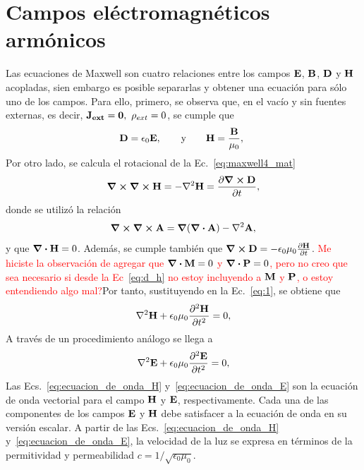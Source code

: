 \section{Campos eléctromagnéticos armónicos}
Las ecuaciones de Maxwell son cuatro relaciones entre los campos $\vb{E}$, $\vb{B}$, $\vb{D}$ y $\vb{H}$ acopladas, sien embargo es posible separarlas y obtener una ecuación para sólo uno de los campos. Para ello, primero, se observa que, en el vacío y sin fuentes externas, es decir, $\vb{J_{ext}}=\vb{0},\ \rho_{ext}=0$, se cumple que
\begin{eqnarray}
\vb{D}=\epsilon_{0}\vb{E},\qquad\text{y}\qquad\vb{H}=\frac{\vb{B}}{\mu_{0}},~\label{eq:d_h}
\end{eqnarray}
Por otro lado, se calcula el rotacional de la Ec.~\eqref{eq:maxwell4_mat}
\begin{equation}
\curl \curl \vb{H}= - \laplacian \vb{H}= \pdv{\curl\vb{D}}{t},\label{eq:1}
\end{equation}
donde se utilizó la relación~\cite{griffiths2013electrodynamics}
\begin{equation}
\curl\curl\vb{A}= \grad(\div \vb{A}) - \laplacian \vb{A},\label{eq:propiedad}
\end{equation}
y que $\div \vb{H}=0$. Además, se cumple también que $\curl\vb{D}=-\epsilon_{0}\mu_{0}\pdv{\vb{H}}{t}$. \textcolor{red}{Me hiciste la observación de agregar que $\div{\vb{M}}=0$ y $\div{\vb{P}}=0$, pero no creo que sea necesario si desde la Ec~\eqref{eq:d_h} no estoy incluyendo a $\vb{M}$ y $\vb{P}$, o estoy entendiendo algo mal?}Por tanto, sustituyendo en la Ec.~\eqref{eq:1}, se obtiene que~\cite{griffiths2013electrodynamics}
\begin{equation}
\laplacian{\vb{H}}+\epsilon_{0}\mu_{0}\pdv[2]{\vb{H}}{t}=0,\label{eq:ecuacion_de_onda_H}
\end{equation}
A través de un procedimiento análogo se llega a
\begin{equation}
\laplacian{\vb{E}}+\epsilon_{0}\mu_{0}\pdv[2]{\vb{E}}{t}=0, \label{eq:ecuacion_de_onda_E}
\end{equation}
Las Ecs.~\eqref{eq:ecuacion_de_onda_H} y~\eqref{eq:ecuacion_de_onda_E} son la ecuación de onda vectorial para el campo $\vb{H}$ y $\vb{E}$, respectivamente. Cada una de las componentes de los campos $\vb{E}$ y $\vb{H}$ debe satisfacer a la ecuación de onda en su versión escalar. A partir de las Ecs.~\eqref{eq:ecuacion_de_onda_H} y~\eqref{eq:ecuacion_de_onda_E}, la velocidad de la luz se expresa en términos de la permitividad y permeabilidad $c=1/\sqrt{\epsilon_{0}\mu_{0}}$.\\

